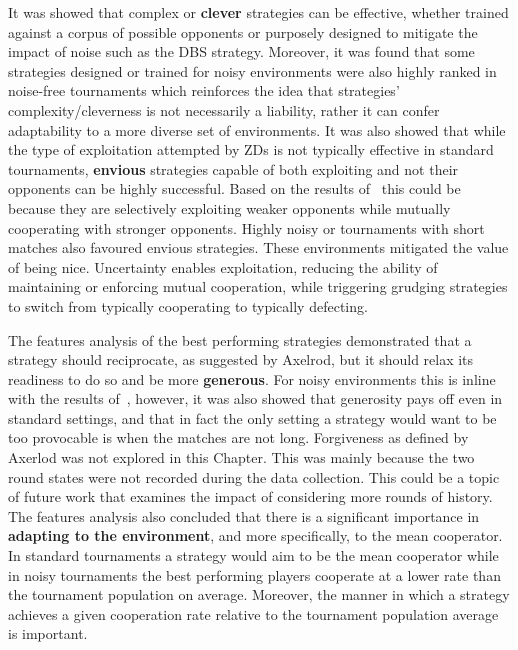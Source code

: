 It was showed that complex or \textbf{clever} strategies can be effective,
whether trained against a corpus of possible opponents or purposely designed to
mitigate the impact of noise such as the DBS strategy. Moreover, it was found
that some strategies designed or trained for noisy environments were also highly
ranked in noise-free tournaments which reinforces the idea that strategies'
complexity/cleverness is not necessarily a liability, rather it can confer
adaptability to a more diverse set of environments.
It was also showed that while the type of exploitation attempted by ZDs is
not typically effective in standard tournaments, \textbf{envious} strategies
capable of both exploiting and not their opponents can be highly successful.
Based on the results of~\cite{Harper2017} this could be because they are
selectively exploiting weaker opponents while mutually cooperating with stronger
opponents. Highly noisy or tournaments with short matches also favoured envious
strategies. These environments mitigated the value of being nice. Uncertainty
enables exploitation, reducing the ability of maintaining or enforcing mutual
cooperation, while triggering grudging strategies to switch from typically
cooperating to typically defecting.

The features analysis of the best performing strategies demonstrated that a
strategy should reciprocate, as suggested by Axelrod, but it should relax its
readiness to do so and be more \textbf{generous}. For noisy environments this is
inline with the results of~\cite{Bendor1991, Donninger1986, Molander1985,
Hammerstein1984}, however, it was also showed that generosity pays off even in
standard settings, and that in fact the only setting a strategy would want to be
too provocable is when the matches are not long. Forgiveness as defined by
Axerlod was not explored in this Chapter. This was mainly because the two round
states were not recorded during the data collection. This could be a topic of
future work that examines the impact of considering more rounds of history. The
features analysis also concluded that there is a significant importance in
\textbf{adapting to the environment}, and more specifically, to the mean
cooperator. In standard tournaments a strategy would aim to be the mean
cooperator while in noisy tournaments the best performing players cooperate at a
lower rate than the tournament population on average. Moreover, the manner in
which a strategy achieves a given cooperation rate relative to the tournament
population average is important.

